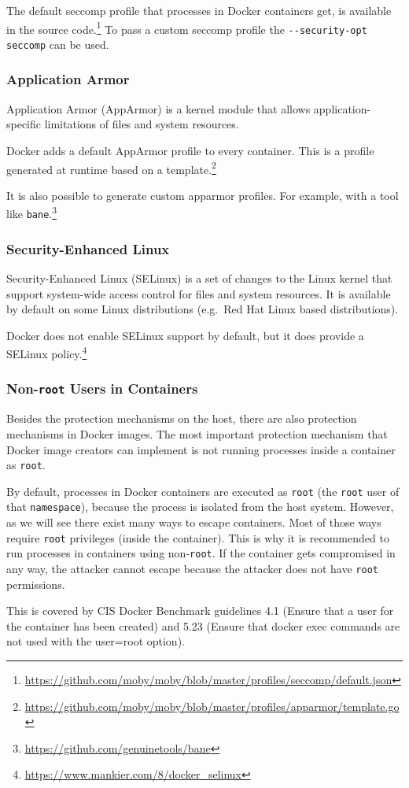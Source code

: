 \medskip

The default seccomp profile that processes in Docker containers get, is available in the source code.\footnote{\url{https://github.com/moby/moby/blob/master/profiles/seccomp/default.json}} To pass a custom seccomp profile the \lstinline{--security-opt seccomp} can be used.

\subsubsection{Application Armor}
Application Armor (AppArmor) is a kernel module that allows application-specific limitations of files and system resources.

Docker adds a default AppArmor profile to every container. This is a profile generated at runtime based on a template.\footnote{\url{https://github.com/moby/moby/blob/master/profiles/apparmor/template.go}}

\medskip

It is also possible to generate custom apparmor profiles. For example, with a tool like \lstinline{bane}.\footnote{\url{https://github.com/genuinetools/bane}}

\subsubsection{Security-Enhanced Linux}
Security-Enhanced Linux (SELinux) is a set of changes to the Linux kernel that support system-wide access control for files and system resources. It is available by default on some Linux distributions (e.g.\ Red Hat Linux based distributions).

\medskip

Docker does not enable SELinux support by default, but it does provide a SELinux policy.\footnote{\url{https://www.mankier.com/8/docker_selinux}}

\subsubsection{Non-\texorpdfstring{\lstinline{root}}{root} Users in Containers}\label{subsection:non-root-user}
Besides the protection mechanisms on the host, there are also protection mechanisms in Docker images. The most important protection mechanism that Docker image creators can implement is not running processes inside a container as \lstinline{root}.

By default, processes in Docker containers are executed as \lstinline{root} (the \lstinline{root} user of that \lstinline{namespace}), because the process is isolated from the host system. However, as we will see there exist many ways to escape containers. Most of those ways require \lstinline{root} privileges (inside the container). This is why it is recommended to run processes in containers using non-\lstinline{root}. If the container gets compromised in any way, the attacker cannot escape because the attacker does not have \lstinline{root} permissions.

\medskip

This is covered by CIS Docker Benchmark guidelines 4.1 (Ensure that a user for the container has been created) and 5.23 (Ensure that docker exec commands are not used with the user=root option).
